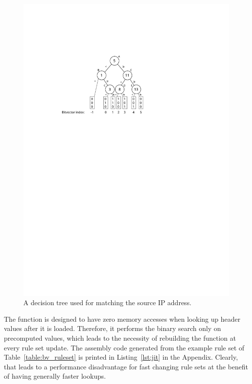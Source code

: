 \documentclass[a4paper,
		12pt,
		parskip=full,
		titlepage
		]{scrartcl}
\begin{document}
\begin{figure}
\centering
\includegraphics[height=0.35\textheight]{images/bv-tree}
\caption{A decision tree used for matching the source IP address.}
\label{fig:bv-tree}
\end{figure}

The function is designed to have zero memory accesses when looking up header 
values after it is loaded.
Therefore, it performs the binary search only on precomputed values, which 
leads to the necessity of rebuilding the function at every rule set update.
The assembly code generated from the example rule set of Table~\ref{table:bv_ruleset} is printed in Listing~\ref{lst:jit} in the Appendix.
Clearly, that leads to a performance disadvantage for fast changing rule sets at the benefit of having generally faster lookups.
\end{document}
